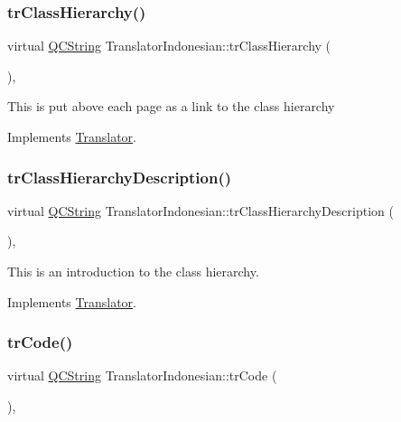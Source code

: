 \subsubsection{\texorpdfstring{trClassHierarchy()}{trClassHierarchy()}}
{\footnotesize\ttfamily virtual \mbox{\hyperlink{class_q_c_string}{Q\+C\+String}} Translator\+Indonesian\+::tr\+Class\+Hierarchy (\begin{DoxyParamCaption}{ }\end{DoxyParamCaption})\hspace{0.3cm}{\ttfamily [inline]}, {\ttfamily [virtual]}}

This is put above each page as a link to the class hierarchy 

Implements \mbox{\hyperlink{class_translator}{Translator}}.

\mbox{\label{class_translator_indonesian_ad51205ea92fa8eb2e9f02cff9fe3db1c}} 
\subsubsection{\texorpdfstring{trClassHierarchyDescription()}{trClassHierarchyDescription()}}
{\footnotesize\ttfamily virtual \mbox{\hyperlink{class_q_c_string}{Q\+C\+String}} Translator\+Indonesian\+::tr\+Class\+Hierarchy\+Description (\begin{DoxyParamCaption}{ }\end{DoxyParamCaption})\hspace{0.3cm}{\ttfamily [inline]}, {\ttfamily [virtual]}}

This is an introduction to the class hierarchy. 

Implements \mbox{\hyperlink{class_translator}{Translator}}.

\mbox{\label{class_translator_indonesian_a5841e57c9da81be2d89f7c91aedb0d27}} 
\subsubsection{\texorpdfstring{trCode()}{trCode()}}
{\footnotesize\ttfamily virtual \mbox{\hyperlink{class_q_c_string}{Q\+C\+String}} Translator\+Indonesian\+::tr\+Code (\begin{DoxyParamCaption}{ }\end{DoxyParamCaption})\hspace{0.3cm}{\ttfamily [inline]}, {\ttfamily [virtual]}}

